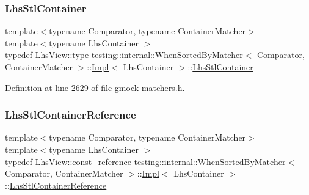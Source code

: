 \subsubsection{\texorpdfstring{Lhs\+Stl\+Container}{LhsStlContainer}}
{\footnotesize\ttfamily template$<$typename Comparator, typename Container\+Matcher$>$ \\
template$<$typename Lhs\+Container $>$ \\
typedef \hyperlink{classtesting_1_1internal_1_1StlContainerView_a2b2c63a6dcdbfe63fb0ee121ebf463ba}{Lhs\+View\+::type} \hyperlink{classtesting_1_1internal_1_1WhenSortedByMatcher}{testing\+::internal\+::\+When\+Sorted\+By\+Matcher}$<$ Comparator, Container\+Matcher $>$\+::\hyperlink{classtesting_1_1internal_1_1WhenSortedByMatcher_1_1Impl}{Impl}$<$ Lhs\+Container $>$\+::\hyperlink{classtesting_1_1internal_1_1WhenSortedByMatcher_1_1Impl_a2cb1a8d85ca2c376b6abdbcb00d84759}{Lhs\+Stl\+Container}}



Definition at line 2629 of file gmock-\/matchers.\+h.

\mbox{\label{classtesting_1_1internal_1_1WhenSortedByMatcher_1_1Impl_ab5e53a762bb213ccf84299b31c825b58}} 
\subsubsection{\texorpdfstring{Lhs\+Stl\+Container\+Reference}{LhsStlContainerReference}}
{\footnotesize\ttfamily template$<$typename Comparator, typename Container\+Matcher$>$ \\
template$<$typename Lhs\+Container $>$ \\
typedef \hyperlink{classtesting_1_1internal_1_1StlContainerView_a9cd4f6ed689b3938cdb7b3c4cbf1b36b}{Lhs\+View\+::const\+\_\+reference} \hyperlink{classtesting_1_1internal_1_1WhenSortedByMatcher}{testing\+::internal\+::\+When\+Sorted\+By\+Matcher}$<$ Comparator, Container\+Matcher $>$\+::\hyperlink{classtesting_1_1internal_1_1WhenSortedByMatcher_1_1Impl}{Impl}$<$ Lhs\+Container $>$\+::\hyperlink{classtesting_1_1internal_1_1WhenSortedByMatcher_1_1Impl_ab5e53a762bb213ccf84299b31c825b58}{Lhs\+Stl\+Container\+Reference}}



